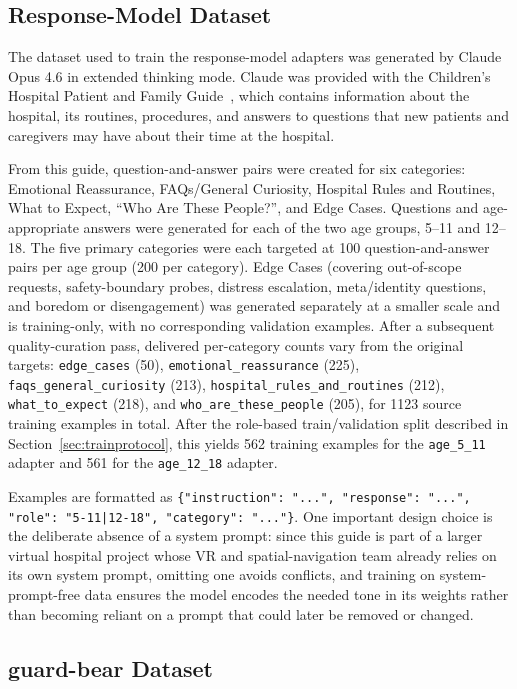 \documentclass[pdflatex,sn-mathphys-num]{sn-jnl}%
\begin{document}
\subsection{Response-Model Dataset}\label{subsec:responsedataset}

The dataset used to train the response-model adapters was generated by Claude Opus 4.6 in extended thinking mode. Claude was provided with the Children's Hospital Patient and Family Guide~\cite{hospitalguide}, which contains information about the hospital, its routines, procedures, and answers to questions that new patients and caregivers may have about their time at the hospital.

From this guide, question-and-answer pairs were created for six categories: Emotional Reassurance, FAQs/General Curiosity, Hospital Rules and Routines, What to Expect, ``Who Are These People?'', and Edge Cases. Questions and age-appropriate answers were generated for each of the two age groups, 5--11 and 12--18. The five primary categories were each targeted at 100 question-and-answer pairs per age group (200 per category). Edge Cases (covering out-of-scope requests, safety-boundary probes, distress escalation, meta/identity questions, and boredom or disengagement) was generated separately at a smaller scale and is training-only, with no corresponding validation examples. After a subsequent quality-curation pass, delivered per-category counts vary from the original targets: \texttt{edge\_cases} (50), \texttt{emotional\_reassurance} (225), \texttt{faqs\_general\_curiosity} (213), \texttt{hospital\_rules\_and\_routines} (212), \texttt{what\_to\_expect} (218), and \texttt{who\_are\_these\_people} (205), for 1123 source training examples in total. After the role-based train/validation split described in Section~\ref{sec:trainprotocol}, this yields 562 training examples for the \texttt{age\_5\_11} adapter and 561 for the \texttt{age\_12\_18} adapter.

Examples are formatted as \texttt{\{"instruction": "...", "response": "...", "role": "5-11|12-18", "category": "..."\}}. One important design choice is the deliberate absence of a system prompt: since this guide is part of a larger virtual hospital project whose VR and spatial-navigation team already relies on its own system prompt, omitting one avoids conflicts, and training on system-prompt-free data ensures the model encodes the needed tone in its weights rather than becoming reliant on a prompt that could later be removed or changed.

\subsection{guard-bear Dataset}\label{subsec:guarddataset}
\end{document}
